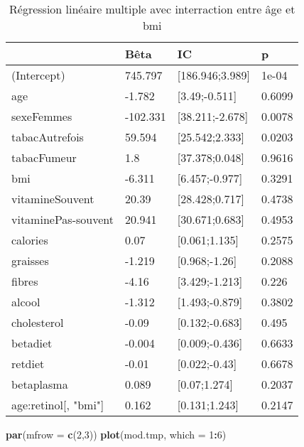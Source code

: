 \documentclass[]{article}
\newenvironment{Shaded}{\begin{snugshade}}{\end{snugshade}}
\newcommand{\KeywordTok}[1]{\textcolor[rgb]{0.13,0.29,0.53}{\textbf{#1}}}
\newcommand{\DataTypeTok}[1]{\textcolor[rgb]{0.13,0.29,0.53}{#1}}
\newcommand{\DecValTok}[1]{\textcolor[rgb]{0.00,0.00,0.81}{#1}}
\newcommand{\OperatorTok}[1]{\textcolor[rgb]{0.81,0.36,0.00}{\textbf{#1}}}
\newcommand{\NormalTok}[1]{#1}
\begin{document}
\begin{table}

\caption{\label{tab:unnamed-chunk-50}Régression linéaire multiple avec interraction entre âge et bmi}
\centering
\begin{tabular}[t]{l|l|l|l}
\hline
  & Bêta & IC & p\\
\hline
\rowcolor[HTML]{BBD2E1}  (Intercept) & 745.797 & [186.946;3.989] & 1e-04\\
\hline
age & -1.782 & [3.49;-0.511] & 0.6099\\
\hline
\rowcolor[HTML]{BBD2E1}  sexeFemmes & -102.331 & [38.211;-2.678] & 0.0078\\
\hline
tabacAutrefois & 59.594 & [25.542;2.333] & 0.0203\\
\hline
\rowcolor[HTML]{BBD2E1}  tabacFumeur & 1.8 & [37.378;0.048] & 0.9616\\
\hline
bmi & -6.311 & [6.457;-0.977] & 0.3291\\
\hline
\rowcolor[HTML]{BBD2E1}  vitamineSouvent & 20.39 & [28.428;0.717] & 0.4738\\
\hline
vitaminePas-souvent & 20.941 & [30.671;0.683] & 0.4953\\
\hline
\rowcolor[HTML]{BBD2E1}  calories & 0.07 & [0.061;1.135] & 0.2575\\
\hline
graisses & -1.219 & [0.968;-1.26] & 0.2088\\
\hline
\rowcolor[HTML]{BBD2E1}  fibres & -4.16 & [3.429;-1.213] & 0.226\\
\hline
alcool & -1.312 & [1.493;-0.879] & 0.3802\\
\hline
\rowcolor[HTML]{BBD2E1}  cholesterol & -0.09 & [0.132;-0.683] & 0.495\\
\hline
betadiet & -0.004 & [0.009;-0.436] & 0.6633\\
\hline
\rowcolor[HTML]{BBD2E1}  retdiet & -0.01 & [0.022;-0.43] & 0.6678\\
\hline
betaplasma & 0.089 & [0.07;1.274] & 0.2037\\
\hline
\rowcolor[HTML]{BBD2E1}  age:retinol[, "bmi"] & 0.162 & [0.131;1.243] & 0.2147\\
\hline
\end{tabular}
\end{table}

\begin{Shaded}
\begin{Highlighting}[]
\KeywordTok{par}\NormalTok{(}\DataTypeTok{mfrow =} \KeywordTok{c}\NormalTok{(}\DecValTok{2}\NormalTok{,}\DecValTok{3}\NormalTok{))}
\KeywordTok{plot}\NormalTok{(mod.tmp, }\DataTypeTok{which =} \DecValTok{1}\OperatorTok{:}\DecValTok{6}\NormalTok{)}
\end{Highlighting}
\end{Shaded}
\end{document}
